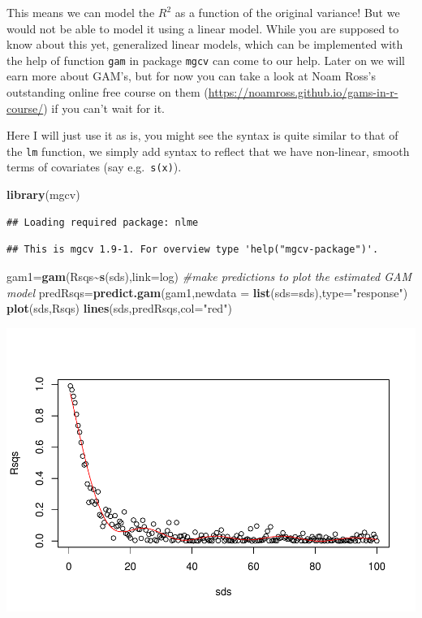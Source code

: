 \documentclass[
]{book}
\newenvironment{Shaded}{\begin{snugshade}}{\end{snugshade}}
\newcommand{\AttributeTok}[1]{\textcolor[rgb]{0.13,0.29,0.53}{#1}}
\newcommand{\CommentTok}[1]{\textcolor[rgb]{0.56,0.35,0.01}{\textit{#1}}}
\newcommand{\FunctionTok}[1]{\textcolor[rgb]{0.13,0.29,0.53}{\textbf{#1}}}
\newcommand{\NormalTok}[1]{#1}
\newcommand{\OtherTok}[1]{\textcolor[rgb]{0.56,0.35,0.01}{#1}}
\newcommand{\SpecialCharTok}[1]{\textcolor[rgb]{0.81,0.36,0.00}{\textbf{#1}}}
\newcommand{\StringTok}[1]{\textcolor[rgb]{0.31,0.60,0.02}{#1}}
\begin{document}
This means we can model the \(R^2\) as a function of the original variance! But we would not be able to model it using a linear model. While you are supposed to know about this yet, generalized linear models, which can be implemented with the help of function \texttt{gam} in package \texttt{mgcv} can come to our help. Later on we will earn more about GAM's, but for now you can take a look at Noam Ross's outstanding online free course on them (\url{https://noamross.github.io/gams-in-r-course/}) if you can't wait for it.

Here I will just use it as is, you might see the syntax is quite similar to that of the \texttt{lm} function, we simply add syntax to reflect that we have non-linear, smooth terms of covariates (say e.g.~\texttt{s(x)}).

\begin{Shaded}
\begin{Highlighting}[]
\FunctionTok{library}\NormalTok{(mgcv)}
\end{Highlighting}
\end{Shaded}

\begin{verbatim}
## Loading required package: nlme
\end{verbatim}

\begin{verbatim}
## This is mgcv 1.9-1. For overview type 'help("mgcv-package")'.
\end{verbatim}

\begin{Shaded}
\begin{Highlighting}[]
\NormalTok{gam1}\OtherTok{=}\FunctionTok{gam}\NormalTok{(Rsqs}\SpecialCharTok{\textasciitilde{}}\FunctionTok{s}\NormalTok{(sds),}\AttributeTok{link=}\NormalTok{log)}
\CommentTok{\#make predictions to plot the estimated GAM model}
\NormalTok{predRsqs}\OtherTok{=}\FunctionTok{predict.gam}\NormalTok{(gam1,}\AttributeTok{newdata =} \FunctionTok{list}\NormalTok{(}\AttributeTok{sds=}\NormalTok{sds),}\AttributeTok{type=}\StringTok{"response"}\NormalTok{)}
\FunctionTok{plot}\NormalTok{(sds,Rsqs)}
\FunctionTok{lines}\NormalTok{(sds,predRsqs,}\AttributeTok{col=}\StringTok{"red"}\NormalTok{)}
\end{Highlighting}
\end{Shaded}

\includegraphics{ECOMODbook_files/figure-latex/a6.32-1.pdf}
\end{document}
